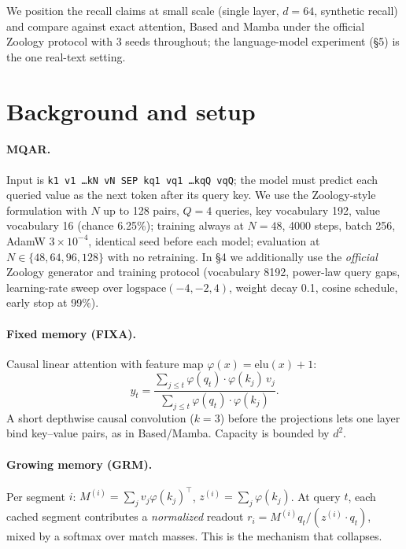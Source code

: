 \documentclass[11pt]{article}
\begin{document}
We position the recall claims at small scale (single layer, $d=64$, synthetic
recall) and compare against exact attention, Based \citep{arora2024based} and
Mamba \citep{gu2023mamba} under the official Zoology protocol
\citep{arora2023zoology} with 3 seeds throughout; the language-model experiment
(\S5) is the one real-text setting.

\section{Background and setup}

\paragraph{MQAR.} Input is \texttt{k1 v1 \ldots kN vN SEP kq1 vq1 \ldots kqQ vqQ};
the model must predict each queried value as the next token after its query key.
We use the Zoology-style formulation with $N$ up to 128 pairs, $Q=4$ queries, key
vocabulary 192, value vocabulary 16 (chance 6.25\%); training always at $N=48$,
4000 steps, batch 256, AdamW $3\times10^{-4}$, identical seed before each model;
evaluation at $N\in\{48,64,96,128\}$ with no retraining. In \S4 we additionally use
the \emph{official} Zoology generator and training protocol (vocabulary 8192,
power-law query gaps, learning-rate sweep over $\mathrm{logspace}(-4,-2,4)$,
weight decay 0.1, cosine schedule, early stop at 99\%).

\paragraph{Fixed memory (FIXA).} Causal linear attention
\citep{katharopoulos2020linear} with feature map
$\varphi(x)=\mathrm{elu}(x)+1$:
\[
y_t = \frac{\sum_{j\le t}\varphi(q_t)\!\cdot\!\varphi(k_j)\,v_j}
            {\sum_{j\le t}\varphi(q_t)\!\cdot\!\varphi(k_j)}.
\]
A short depthwise causal convolution ($k=3$) before the projections lets one
layer bind key--value pairs, as in Based/Mamba. Capacity is bounded by $d^2$.

\paragraph{Growing memory (GRM).} Per segment $i$:
$M^{(i)}=\sum_j v_j\varphi(k_j)^\top$,
$z^{(i)}=\sum_j\varphi(k_j)$. At query $t$, each cached segment contributes a
\emph{normalized} readout
$r_i = M^{(i)}q_t / (z^{(i)}\!\cdot\!q_t)$, mixed by a softmax over match masses.
This is the mechanism that collapses.
\end{document}
